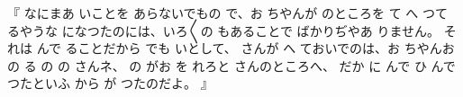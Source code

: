 『
なにまあ
いことを
あらないでもの
で、お
ちやんが
のところを
て
へ
つて
るやうな
になつたのには、いろ〳〵の
もあることで
ばかりぢやあ
りません。
それは
んで
ることだから
でも
いとして、
さんが
へ
ておいでのは、お
ちやんお
の
る
の
の
さんネ、
の
がお
を
れろと
さんのところへ、
だか
に
んで
ひ
んで
つたといふ
から
が
つたのだよ。
』

